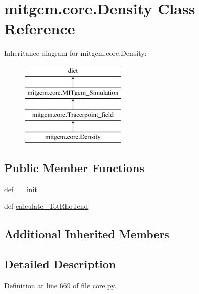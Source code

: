 \hypertarget{classmitgcm_1_1core_1_1Density}{\section{mitgcm.\+core.\+Density Class Reference}
\label{classmitgcm_1_1core_1_1Density}
}
Inheritance diagram for mitgcm.\+core.\+Density\+:\begin{figure}[H]
\begin{center}
\leavevmode
\includegraphics[height=4.000000cm]{classmitgcm_1_1core_1_1Density}
\end{center}
\end{figure}
\subsection*{Public Member Functions}
\begin{DoxyCompactItemize}
\item 
def \hyperlink{classmitgcm_1_1core_1_1Density_ac4f90f6a9c4a9fe9608b5bfdcb09a47c}{\+\_\+\+\_\+init\+\_\+\+\_\+}
\item 
def \hyperlink{classmitgcm_1_1core_1_1Density_aa8d1673db5cfbcd7fda25ad38a29b3a8}{calculate\+\_\+\+Tot\+Rho\+Tend}
\end{DoxyCompactItemize}
\subsection*{Additional Inherited Members}


\subsection{Detailed Description}


Definition at line 669 of file core.\+py.



